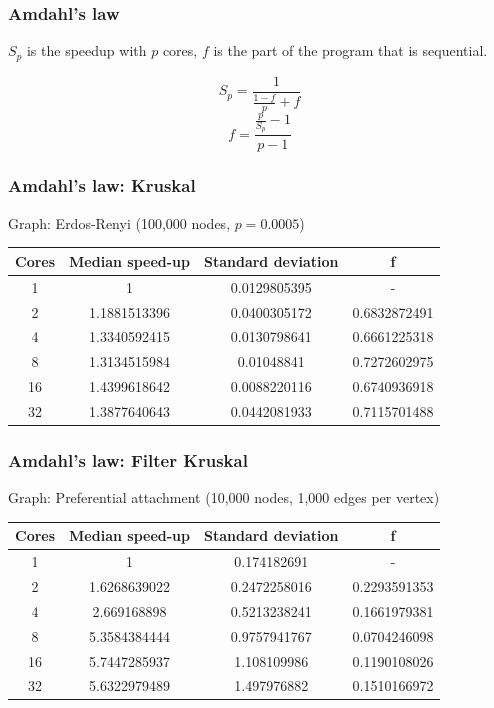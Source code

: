 \documentclass{beamer}
\begin{document}
\begin{frame}
    \frametitle{Amdahl's law}

	$S_p$ is the speedup with $p$ cores, $f$ is the part of the program that is sequential.

	\[
		S_p = \frac{1}{\frac{1-f}{p} + f}
	\]
	\[
		f = \frac{\frac{p}{S_p} - 1}{p - 1}
	\]

\end{frame}

\begin{frame}

    \frametitle{Amdahl's law: Kruskal}

	Graph: Erdos-Renyi (100,000 nodes, $p=0.0005$)

	\begin{center}
		\begin{tabular}{||c c c c||} 
			\hline
            Cores & Median speed-up & Standard deviation & f \\ [0.5ex] 
			\hline\hline
            1 & 1 & 0.0129805395 & - \\
			\hline
            2 & 1.1881513396 & 0.0400305172 & 0.6832872491 \\
			\hline
            4 & 1.3340592415 & 0.0130798641 & 0.6661225318 \\
			\hline
            8 & 1.3134515984 & 0.01048841 & 0.7272602975 \\
			\hline
            16 & 1.4399618642 & 0.0088220116 & 0.6740936918 \\
			\hline
            32 & 1.3877640643 & 0.0442081933 & 0.7115701488 \\ [1ex] 
			\hline
		\end{tabular}
	\end{center}

\end{frame}

\begin{frame}

    \frametitle{Amdahl's law: Filter Kruskal}

	Graph: Preferential attachment (10,000 nodes, 1,000 edges per vertex)

	\begin{center}
		\begin{tabular}{||c c c c||} 
			\hline
            Cores & Median speed-up & Standard deviation & f \\ [0.5ex] 
			\hline\hline
			1 & 1 & 0.174182691 & - \\
			\hline
			2 & 1.6268639022 & 0.2472258016 & 0.2293591353 \\
			\hline
			4 & 2.669168898	& 0.5213238241 & 0.1661979381 \\
			\hline
			8 & 5.3584384444 & 0.9757941767 & 0.0704246098 \\
			\hline
			16 & 5.7447285937 & 1.108109986 & 0.1190108026 \\
			\hline
			32 & 5.6322979489 & 1.497976882 & 0.1510166972 \\ [1ex] 
			\hline
		\end{tabular}
	\end{center}

\end{frame}
\end{document}
